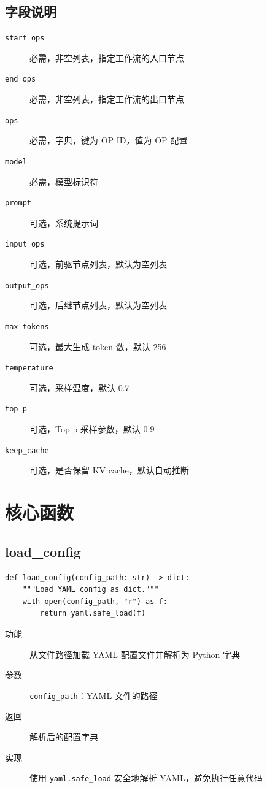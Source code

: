 \documentclass[12pt,a4paper]{article}
\begin{document}
\subsection{字段说明}

\begin{description}
    \item[\texttt{start_ops}] 必需，非空列表，指定工作流的入口节点
    \item[\texttt{end_ops}] 必需，非空列表，指定工作流的出口节点
    \item[\texttt{ops}] 必需，字典，键为 OP ID，值为 OP 配置
    \item[\texttt{model}] 必需，模型标识符
    \item[\texttt{prompt}] 可选，系统提示词
    \item[\texttt{input_ops}] 可选，前驱节点列表，默认为空列表
    \item[\texttt{output_ops}] 可选，后继节点列表，默认为空列表
    \item[\texttt{max_tokens}] 可选，最大生成 token 数，默认 256
    \item[\texttt{temperature}] 可选，采样温度，默认 0.7
    \item[\texttt{top_p}] 可选，Top-p 采样参数，默认 0.9
    \item[\texttt{keep_cache}] 可选，是否保留 KV cache，默认自动推断
\end{description}

\section{核心函数}

\subsection{load\_config}

\begin{lstlisting}
def load_config(config_path: str) -> dict:
    """Load YAML config as dict."""
    with open(config_path, "r") as f:
        return yaml.safe_load(f)
\end{lstlisting}

\begin{description}
    \item[功能] 从文件路径加载 YAML 配置文件并解析为 Python 字典
    \item[参数] \texttt{config_path}：YAML 文件的路径
    \item[返回] 解析后的配置字典
    \item[实现] 使用 \texttt{yaml.safe\_load} 安全地解析 YAML，避免执行任意代码
\end{description}
\end{document}

